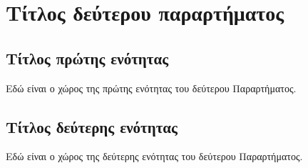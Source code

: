 \chapter{Τίτλος δεύτερου παραρτήματος}
\label{app:SecondAppendix}
\minitoc

\section{Τίτλος πρώτης ενότητας}
\label{sec:FirstSection}
Εδώ είναι ο χώρος της πρώτης ενότητας του δεύτερου Παραρτήματος.

\section{Τίτλος δεύτερης ενότητας}
\label{sec:SecondSection}
Εδώ είναι ο χώρος της δεύτερης ενότητας του δεύτερου Παραρτήματος.
